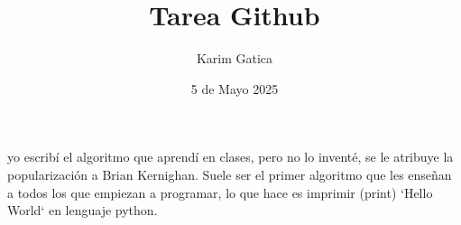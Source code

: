 \documentclass{article}
\title{Tarea Github}
\author{Karim Gatica}
\date{5 de Mayo 2025}
\begin{document}
\maketitle

yo escribí el algoritmo que aprendí en clases, pero no lo inventé, se le atribuye la popularización a Brian Kernighan. Suele ser el primer algoritmo que les enseñan a todos los que empiezan a programar, lo que hace es imprimir (print) `Hello World` en lenguaje python.
\end{document}
